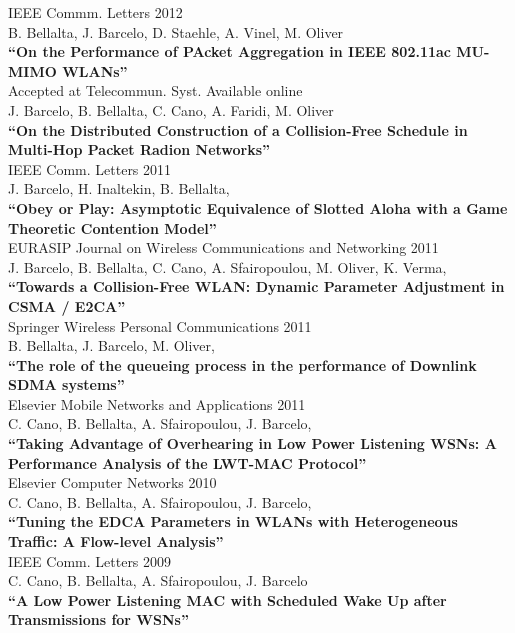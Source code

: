 \documentclass[line,margin]{res}
\begin{document}
\begin{resume}
\hfill {IEEE Commm. Letters 2012} \\
B. Bellalta, J. Barcelo, D. Staehle, A. Vinel, M. Oliver\\
\textbf{``On the Performance of PAcket Aggregation in IEEE 802.11ac MU-MIMO WLANs''}\\

\hfill {Accepted at Telecommun. Syst. Available online} \\
J. Barcelo, B. Bellalta, C. Cano, A. Faridi, M. Oliver\\
\textbf{``On the Distributed Construction of a Collision-Free Schedule in Multi-Hop Packet Radion Networks''}\\

\hfill {IEEE Comm. Letters 2011} \\
J. Barcelo, H. Inaltekin, B. Bellalta,\\
\textbf{``Obey or Play: Asymptotic Equivalence of Slotted Aloha with a Game Theoretic Contention Model''}\\

\hfill {EURASIP Journal on Wireless Communications and Networking 2011} \\
J. Barcelo, B. Bellalta, C. Cano, A. Sfairopoulou, M. Oliver, K. Verma,\\
\textbf{``Towards a Collision-Free WLAN: Dynamic Parameter Adjustment in CSMA / E2CA''}\\

\hfill {Springer Wireless Personal Communications 2011} \\
B. Bellalta, J. Barcelo, M. Oliver,\\
\textbf{``The role of the queueing process in the performance of Downlink SDMA systems''}\\

\hfill {Elsevier Mobile Networks and Applications 2011} \\
C. Cano, B. Bellalta, A. Sfairopoulou, J. Barcelo,\\
\textbf{``Taking Advantage of Overhearing in Low Power Listening WSNs: A Performance Analysis of the LWT-MAC Protocol''}\\

\hfill {Elsevier Computer Networks 2010} \\
C. Cano, B. Bellalta, A. Sfairopoulou, J. Barcelo,\\
\textbf{``Tuning the EDCA Parameters in WLANs with Heterogeneous Traffic: A Flow-level Analysis''}\\

\hfill {IEEE Comm. Letters 2009} \\
C. Cano, B. Bellalta, A. Sfairopoulou, J. Barcelo\\
\textbf{``A Low Power Listening MAC with Scheduled Wake Up after Transmissions for WSNs''}\\


\end{resume}
\end{document}
